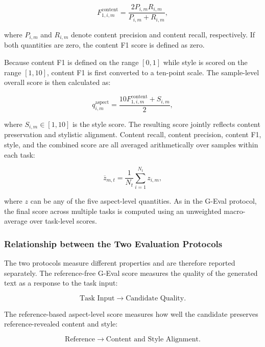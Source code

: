 \documentclass{article} %
\begin{document}
\begin{equation}
F^{\mathrm{content}}_{1,i,m}
=
\frac{
2P_{i,m}R_{i,m}
}{
P_{i,m}+R_{i,m}
},
\end{equation}

where $P_{i,m}$ and $R_{i,m}$ denote content precision and content recall, respectively. If both quantities are zero, the content F1 score is defined as zero.

Because content F1 is defined on the range $[0,1]$ while style is scored on the range $[1,10]$, content F1 is first converted to a ten-point scale. The sample-level overall score is then calculated as:

\begin{equation}
q^{\mathrm{aspect}}_{i,m}
=
\frac{
10F^{\mathrm{content}}_{1,i,m}
+
S_{i,m}
}{2},
\end{equation}

where $S_{i,m}\in[1,10]$ is the style score. The resulting score jointly reflects content preservation and stylistic alignment. Content recall, content precision, content F1, style, and the combined score are all averaged arithmetically over samples within each task:

\begin{equation}
\overline{z}_{m,t}
=
\frac{1}{N_t}
\sum_{i=1}^{N_t} z_{i,m},
\end{equation}

where $z$ can be any of the five aspect-level quantities. As in the G-Eval protocol, the final score across multiple tasks is computed using an unweighted macro-average over task-level scores.

\subsubsection{Relationship between the Two Evaluation Protocols}

The two protocols measure different properties and are therefore reported separately. The reference-free G-Eval score measures the quality of the generated text as a response to the task input:

\begin{equation}
\text{Task Input}
\longrightarrow
\text{Candidate Quality}.
\end{equation}

The reference-based aspect-level score measures how well the candidate preserves reference-revealed content and style:

\begin{equation}
\text{Reference}
\longrightarrow
\text{Content and Style Alignment}.
\end{equation}
\end{document}
